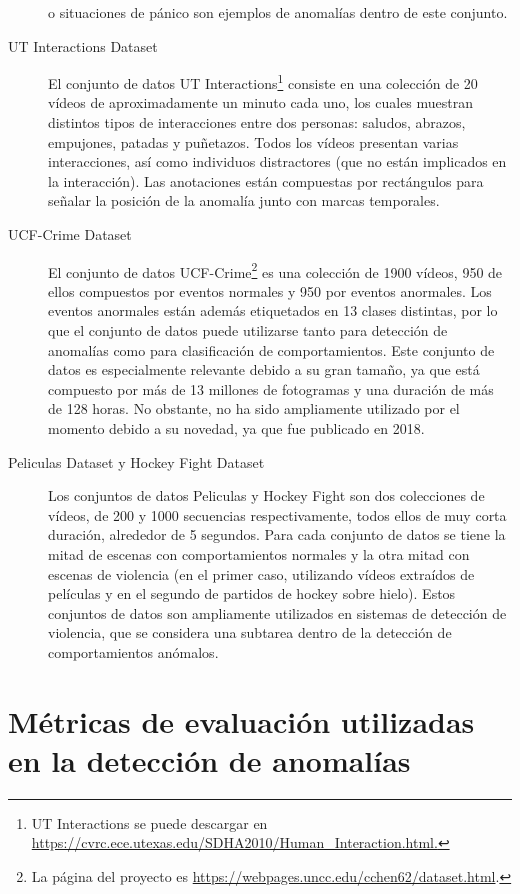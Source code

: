 \documentclass[../main.tex]{memoir}
\begin{document}
\begin{description}
  o situaciones de pánico son ejemplos de anomalías dentro de este
  conjunto.
\item[UT Interactions Dataset] El conjunto de datos UT
  Interactions\footnote{UT Interactions se puede descargar en
    \url{https://cvrc.ece.utexas.edu/SDHA2010/Human_Interaction.html.}}
  \cite{ut-interaction} consiste en una colección de 20 vídeos de
  aproximadamente un minuto cada uno, los cuales muestran distintos
  tipos de interacciones entre dos personas: saludos, abrazos,
  empujones, patadas y puñetazos. Todos los vídeos presentan varias
  interacciones, así como individuos distractores (que no están
  implicados en la interacción). Las anotaciones están compuestas por
  rectángulos para señalar la posición de la anomalía junto con marcas
  temporales.
\item[UCF-Crime Dataset] El conjunto de datos UCF-Crime\footnote{La
    página del proyecto es
    \url{https://webpages.uncc.edu/cchen62/dataset.html}.}
  \cite{sultani2018real} es una colección de 1900 vídeos, 950 de ellos
  compuestos por eventos normales y 950 por eventos anormales. Los
  eventos anormales están además etiquetados en 13 clases distintas,
  por lo que el conjunto de datos puede utilizarse tanto para
  detección de anomalías como para clasificación de
  comportamientos. Este conjunto de datos es especialmente relevante
  debido a su gran tamaño, ya que está compuesto por más de 13
  millones de fotogramas y una duración de más de 128 horas. No
  obstante, no ha sido ampliamente utilizado por el momento debido
  a su novedad, ya que fue publicado en 2018.
\item[Peliculas Dataset y Hockey Fight Dataset] Los conjuntos de datos
  Peliculas \cite{nievas2011violence} y Hockey Fight
  \cite{nievas2011hockey} son dos colecciones de vídeos, de 200 y 1000
  secuencias respectivamente, todos ellos de muy corta duración,
  alrededor de 5 segundos. Para cada conjunto de datos se tiene la mitad
  de escenas con comportamientos normales y la otra mitad con escenas
  de violencia (en el primer caso, utilizando vídeos extraídos de
  películas y en el segundo de partidos de hockey sobre hielo). Estos
  conjuntos de datos son ampliamente utilizados en sistemas de detección
  de violencia, que se considera una subtarea dentro de la detección de
  comportamientos anómalos.
\end{description}

\section{Métricas de evaluación utilizadas en la detección de anomalías}
\end{document}
